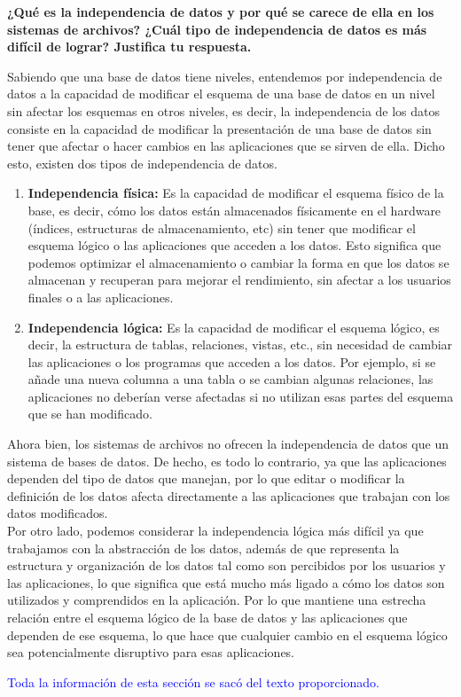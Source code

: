 \begin{center}
\textbf{¿Qué es la independencia de datos y por qué se carece de ella en los sistemas de archivos? ¿Cuál tipo de independencia de datos es más difícil de lograr? Justifica tu respuesta.} \\
\end{center}

Sabiendo que una base de datos tiene niveles, entendemos por independencia de datos a la capacidad de modificar el esquema de una base de datos en un nivel sin afectar los esquemas en otros niveles, es decir, la independencia de los datos consiste en la capacidad de modificar la presentación de una base de datos sin tener que afectar o hacer cambios en las aplicaciones que se sirven de ella. Dicho esto, existen dos tipos de independencia de datos.


\begin{enumerate}
    \item \textbf{Independencia física:} Es la capacidad de modificar el esquema físico de la base, es decir,  cómo los datos están almacenados físicamente en el hardware (índices, estructuras de almacenamiento, etc) sin tener que modificar el esquema lógico o las aplicaciones que acceden a los datos. Esto significa que podemos optimizar el almacenamiento o cambiar la forma en que los datos se almacenan y recuperan para mejorar el rendimiento, sin afectar a los usuarios finales o a las aplicaciones.
    \item \textbf{Independencia lógica:} Es la capacidad de modificar el esquema lógico, es decir, la estructura de tablas, relaciones, vistas, etc., sin necesidad de cambiar las aplicaciones o los programas que acceden a los datos. Por ejemplo, si se añade una nueva columna a una tabla o se cambian algunas relaciones, las aplicaciones no deberían verse afectadas si no utilizan esas partes del esquema que se han modificado.
\end{enumerate}

Ahora bien, los sistemas de archivos no ofrecen la independencia de datos que un sistema de bases de datos. De hecho, es todo lo contrario, ya que las aplicaciones dependen del tipo de datos que manejan, por lo que editar o modificar la definición de los datos afecta directamente a las aplicaciones que trabajan con los datos modificados. \\

Por otro lado, podemos considerar la independencia lógica más difícil ya que trabajamos con la abstracción de los datos, además de que representa la estructura y organización de los datos tal como son percibidos por los usuarios y las aplicaciones, lo que significa que está mucho más ligado a cómo los datos son utilizados y comprendidos en la aplicación. Por lo que mantiene una estrecha relación entre el esquema lógico de la base de datos y las aplicaciones que dependen de ese esquema, lo que hace que cualquier cambio en el esquema lógico sea potencialmente disruptivo para esas aplicaciones.

\textcolor{blue}{Toda la información de esta sección se sacó del texto proporcionado. \cite{independencia}}
\\